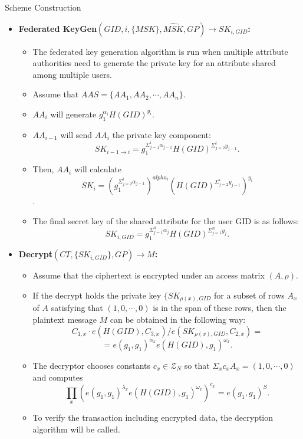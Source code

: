 \documentclass[11pt]{beamer}
\begin{document}
\begin{frame}[allowframebreaks]{Scheme Construction}
\begin{itemize}
\item \textbf{Federated KeyGen$(GID, i, \{MSK\}, \hat{MSK}, GP) \rightarrow SK_{i, GID}$:}
	\begin{itemize}
	\item The federated key generation algorithm is run when multiple attribute authorities need to generate the private key for an attribute shared among multiple users.
	\item Assume that $AAS = \{AA_1, AA_2, \cdots, AA_n\}$.
	\item $AA_i$ will generate $g_1^{\alpha_i} H(GID)^{y_i}$.
	\item $AA_{i - 1}$ will send $AA_i$ the private key component:
	\[ SK_{i - 1 \rightarrow i} = g_1^{\Sigma_{j = 1}^i \alpha_{j - 1}} H(GID)^{\Sigma_{j = 2} ^ i y_{j - 1}}.\]
	\item Then, $AA_i$ will calculate
	\[ SK_i = (g_1^{\Sigma_{j = 2}^i \alpha_{j - 1}})^{alpha_i} (H(GID)^{\Sigma_{j = 2}^i y_{j - 1}})^{y_i}\].
	\item The final secret key of the shared attribute for the user GID is as follows:
	\[ SK_{i,GID} = g_1^{\Sigma_{j = 1} ^ n \alpha_j}H(GID)^{\Sigma_{j = 1} ^ n y_j}.\]
	\end{itemize}
	
\item \textbf{Decrypt$(CT, \{SK_{i,GID}\}, GP) \rightarrow M$:}
	\begin{itemize}
	\item Assume that the ciphertext is encrypted under an access matrix $(A, \rho)$.
	\item If the decrypt holds the private key $\{SK_{\rho(x), GID}$ for a subset of rows $A_x$ of $A$ satisfying that $(1, 0, \cdots, 0)$ is in the span of these rows, then the plaintext message $M$ can be obtained in the following way:
	\[C_{1,x} \cdot e(H(GID), C_{3,x})/e(SK_{\rho(x),GID}, C_{2,x}) = \]
	\[=e(g_1,g_1)^{\alpha_x}e(H(GID), g_1)^{\omega_x}.\]
	\item The decryptor chooses constants $c_x \in \mathcal{Z}_N$ so that $\Sigma_x c_x A_x = (1, 0, \cdots, 0)$ and computes
	\[\prod_x (e(g_1, g_1)^{\lambda_x} e(H(GID), g_1)^{\omega_x})^{c_x} = e(g_1, g_1)^S.\]
	\item To verify the transaction including encrypted data, the decryption algorithm will be called.
	\end{itemize}

\end{itemize}

\end{frame}
\end{document}
